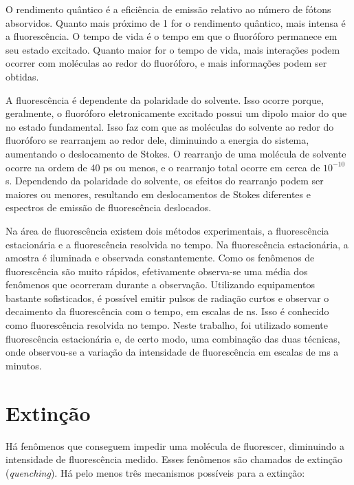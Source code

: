 		O rendimento quântico é a eficiência de emissão relativo ao número de fótons absorvidos. Quanto mais próximo de 1 for o rendimento quântico, mais intensa é a fluorescência. O tempo de vida é o tempo em que o fluoróforo permanece em seu estado excitado. Quanto maior for o tempo de vida, mais interações podem ocorrer com moléculas ao redor do fluoróforo, e mais informações podem ser obtidas. \cite{Lakowicz2006}
		
		A fluorescência é dependente da polaridade do solvente.  Isso ocorre porque, geralmente, o fluoróforo eletronicamente excitado possui um dipolo maior do que no estado fundamental. Isso faz com que as moléculas do solvente ao redor do fluoróforo se rearranjem ao redor dele, diminuindo a energia do sistema, aumentando o deslocamento de Stokes. O rearranjo de uma molécula de solvente ocorre na ordem de 40 ps ou menos, e o rearranjo total ocorre em cerca de \(10^{-10}\) s. Dependendo da polaridade do solvente, os efeitos do rearranjo podem ser maiores ou menores, resultando em deslocamentos de Stokes diferentes e espectros de emissão de fluorescência deslocados.\cite{Lakowicz2006}
		
		Na área de fluorescência existem dois métodos experimentais, a fluorescência estacionária e a fluorescência resolvida no tempo. Na fluorescência estacionária, a amostra é iluminada e observada constantemente. Como os fenômenos de fluorescência são muito rápidos, efetivamente observa-se uma média dos fenômenos que ocorreram durante a observação. Utilizando equipamentos bastante sofisticados, é possível emitir pulsos de radiação curtos e observar o decaimento da fluorescência com o tempo, em escalas de ns. Isso é conhecido como fluorescência resolvida no tempo. Neste trabalho, foi utilizado somente fluorescência estacionária e, de certo modo, uma combinação das duas técnicas, onde observou-se a variação da intensidade de fluorescência em escalas de ms a minutos.\cite{Lakowicz2006}
		
		\section{Extinção} 
		
		Há fenômenos que conseguem impedir uma molécula de fluorescer, diminuindo a intensidade de fluorescência medido. Esses fenômenos são chamados de extinção (\emph{quenching}). Há pelo menos três mecanismos possíveis para a extinção:
		

